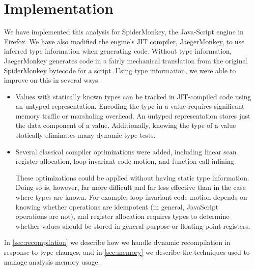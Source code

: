 
\section{Implementation}
\label{sec:implementation}

We have implemented this analysis for SpiderMonkey, the Java-Script engine
in Firefox.
We have also modified the engine's JIT compiler, JaegerMonkey, to use
inferred type information when generating code.
Without type information, JaegerMonkey generates code in a fairly mechanical
translation from the original SpiderMonkey bytecode for a script.
Using type information, we were able to improve on this in several ways:

\begin{itemize}

\item Values with statically known types can be tracked in JIT-compiled code
using an untyped representation.
Encoding the type in a value requires significant memory traffic or
marshaling overhead.
An untyped representation stores just the data component of a value.
Additionally, knowing the type of a value statically eliminates many
dynamic type tests.

\item Several classical compiler optimizations were added,
including linear scan register allocation, loop invariant code motion,
and function call inlining.

These optimizations could be applied without
having static type information.
Doing so is, however, far more difficult and far less effective than in
the case where types are known. For example, loop invariant code motion depends
on knowing whether operations
are idempotent (in general, JavaScript operations are not),
and register allocation requires types to determine whether values should
be stored in general purpose or floating point registers.

\end{itemize}

In \Section\ref{sec:recompilation} we describe how we handle dynamic recompilation in
response to type changes, and in \Section\ref{sec:memory} we describe the techniques
used to manage analysis memory usage.

